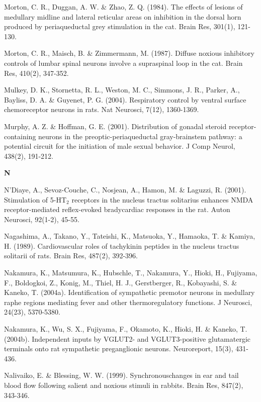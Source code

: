 \documentclass[a4paper,12pt,twoside]{report}
\begin{document}
\begin{singlespacing}
\begin{footnotesize}
Morton, C. R., Duggan, A. W. \& Zhao, Z. Q. (1984). The effects of lesions of medullary midline and lateral reticular areas on inhibition in the dorsal horn produced by periaqueductal grey stimulation in the cat. Brain Res, 301(1), 121-130.

Morton, C. R., Maisch, B. \& Zimmermann, M. (1987). Diffuse noxious inhibitory controls of lumbar spinal neurons involve a supraspinal loop in the cat. Brain Res, 410(2), 347-352.

Mulkey, D. K., Stornetta, R. L., Weston, M. C., Simmons, J. R., Parker, A., Bayliss, D. A. \& Guyenet, P. G. (2004). Respiratory control by ventral surface chemoreceptor neurons in rats. Nat Neurosci, 7(12), 1360-1369.

Murphy, A. Z. \& Hoffman, G. E. (2001). Distribution of gonadal steroid receptor-containing neurons in the preoptic-periaqueductal gray-brainstem pathway: a potential circuit for the initiation of male sexual behavior. J Comp Neurol, 438(2), 191-212.

\medskip
\begin{Large}\textbf{N}\end{Large}

N'Diaye, A., Sevoz-Couche, C., Nosjean, A., Hamon, M. \& Laguzzi, R. (2001). Stimulation of 5-HT$_{2}$ receptors in the nucleus tractus solitarius enhances NMDA receptor-mediated reflex-evoked bradycardiac responses in the rat. Auton Neurosci, 92(1-2), 45-55.

Nagashima, A., Takano, Y., Tateishi, K., Matsuoka, Y., Hamaoka, T. \& Kamiya, H. (1989). Cardiovascular roles of tachykinin peptides in the nucleus tractus solitarii of rats. Brain Res, 487(2), 392-396.

Nakamura, K., Matsumura, K., Hubschle, T., Nakamura, Y., Hioki, H., Fujiyama, F., Boldogkoi, Z., Konig, M., Thiel, H. J., Gerstberger, R., Kobayashi, S. \& Kaneko, T. (2004a). Identification of sympathetic premotor neurons in medullary raphe regions mediating fever and other thermoregulatory functions. J Neurosci, 24(23), 5370-5380.

Nakamura, K., Wu, S. X., Fujiyama, F., Okamoto, K., Hioki, H. \& Kaneko, T. (2004b). Independent inputs by VGLUT2- and VGLUT3-positive glutamatergic terminals onto rat sympathetic preganglionic neurons. Neuroreport, 15(3), 431-436.

Nalivaiko, E. \& Blessing, W. W. (1999). Synchronous\linebreak changes in ear and tail blood flow following salient and noxious stimuli in rabbits. Brain Res, 847(2), 343-346.


\end{footnotesize}
\end{singlespacing}
\end{document}

